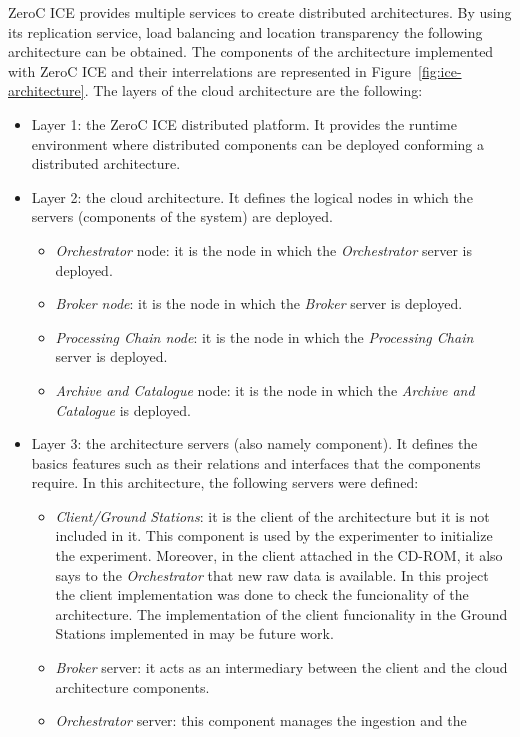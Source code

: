 ZeroC ICE provides multiple services to create distributed
architectures. By using its replication service, load balancing and location
transparency the following architecture can be obtained.
The components of the architecture implemented with ZeroC ICE and their
interrelations are represented in Figure~\ref{fig:ice-architecture}. The layers
of the cloud architecture are the
following:
\begin{itemize}
\item Layer 1: the ZeroC ICE distributed platform. It provides the runtime environment
  where distributed components can be deployed conforming a distributed
  architecture.
\item Layer 2: the cloud architecture. It defines the logical nodes in which the
  servers (components of the system) are deployed.
\begin{itemize}
\item \emph{Orchestrator} node: it is the node in which the \emph{Orchestrator} server
  is deployed.
\item \emph{Broker node}: it is the node in which the \emph{Broker} server is
  deployed.
\item \emph{Processing Chain node}: it is the node in which the \emph{Processing
  Chain} server is deployed.
\item \emph{Archive and Catalogue} node: it is the node in which the
  \emph{Archive and Catalogue} is deployed.
\end{itemize}
\item Layer 3: the architecture servers (also namely component). It defines the basics features such
  as their relations and interfaces that the components require. In this architecture, the following servers were defined:
\begin{itemize}
\item \emph{Client/Ground Stations}: it is the client of the architecture but it
  is not included in it. This component is used by the experimenter to
  initialize the experiment. Moreover, in the client attached in the CD-ROM, it
  also says to the \emph{Orchestrator} that new raw data is available. In this
  project the client implementation was done to check the funcionality of the
  architecture. The implementation of the client
  funcionality in the Ground Stations implemented in \vw may be future work.
\item \emph{Broker} server: it acts as an intermediary between the client and the cloud architecture
  components. 
\item \emph{Orchestrator} server: this component manages the ingestion and the

\end{itemize}
\end{itemize}

